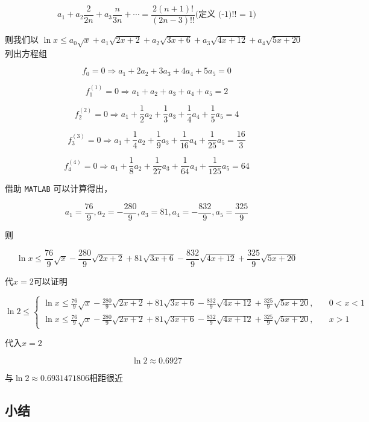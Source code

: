 \documentclass[12pt]{article}
\theoremstyle{definition}
\theoremstyle{plain}
\theoremstyle{definition}
\begin{document}
\[a_{1} + a_{2}\frac{2}{2n} + a_{3}\frac{n}{3n} + \cdots = \frac{2(n + 1)!}{(2n - 3)!!}\text{(定义 (-1)!! = 1)}\]

则我们以
\(\ln x \leq a_{0}\sqrt{x} + a_{1}\sqrt{2x + 2} + a_{2}\sqrt{3x + 6} + a_{3}\sqrt{4x + 12} + a_{4}\sqrt{5x + 20}\)
列出方程组

\[f_{0} = 0 \Rightarrow a_{1} + 2a_{2} + 3a_{3} + 4a_{4} + 5a_{5} = 0\]

\[f_{1}^{(1)} = 0 \Rightarrow a_{1} + a_{2} + a_{3} + a_{4} + a_{5} = 2\]

\[f_{2}^{(2)} = 0 \Rightarrow a_{1} + \frac{1}{2}a_{2} + \frac{1}{3}a_{3} + \frac{1}{4}a_{4} + \frac{1}{5}a_{5} = 4\]

\[f_{3}^{(3)} = 0 \Rightarrow a_{1} + \frac{1}{4}a_{2} + \frac{1}{9}a_{3} + \frac{1}{16}a_{4} + \frac{1}{25}a_{5} = \frac{16}{3}\]

\[f_{4}^{(4)} = 0 \Rightarrow a_{1} + \frac{1}{8}a_{2} + \frac{1}{27}a_{3} + \frac{1}{64}a_{4} + \frac{1}{125}a_{5} = 64\]

借助 \texttt{MATLAB} 可以计算得出，

\[a_{1} = \frac{76}{9},a_{2} = - \frac{280}{9},a_{3} = 81,a_{4} = - \frac{832}{9},a_{5} = \frac{325}{9}\]

则

\[\ln x \leq \frac{76}{9}\sqrt{x} - \frac{280}{9}\sqrt{2x + 2} + 81\sqrt{3x + 6} - \frac{832}{9}\sqrt{4x + 12} + \frac{325}{9}\sqrt{5x + 20}\]

代\(x = 2\)可以证明

\begin{equation*}
\ln 2 \leq \begin{cases}
\ln x \leq \frac{76}{9}\sqrt{x} - \frac{280}{9}\sqrt{2x + 2} + 81\sqrt{3x + 6} - \frac{832}{9}\sqrt{4x + 12} + \frac{325}{9}\sqrt{5x + 20}, & \quad 0 < x < 1 \\
\ln x \leq \frac{76}{9}\sqrt{x} - \frac{280}{9}\sqrt{2x + 2} + 81\sqrt{3x + 6} - \frac{832}{9}\sqrt{4x + 12} + \frac{325}{9}\sqrt{5x + 20}, & \quad x > 1
\end{cases}
\end{equation*}

代入\(x = 2\)

\[\ln 2 \approx 0.6927\]

与\(\ln 2 \approx 0.6931471806\)相距很近

\subsection{小结}
\end{document}
